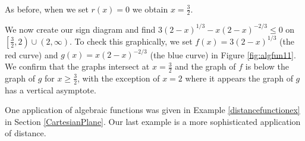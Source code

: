 {\begin{enumerate}
\begin{itemize}
\[\begin{array}{rclr}
       
\end{array}\]


As before, when we set $r(x) = 0$ we obtain $x = \frac{3}{2}$.


\end{itemize}

We now create our sign diagram and find  $3 (2-x)^{1/3} - x (2-x)^{-2/3} \leq 0$ on $\left[\frac{3}{2},2\right) \cup (2, \infty)$.  To check this graphically, we set $f(x)=3 (2-x)^{1/3}$ (the red curve) and $g(x) = x (2-x)^{-2/3}$ (the blue curve) in Figure \ref{fig:algfun11}. We confirm that the graphs intersect at $x=\frac{3}{2}$ and the graph of $f$ is below the graph of $g$ for $x \geq \frac{3}{2}$, with the exception of $x=2$ where it appears the graph of $g$ has a vertical asymptote. 


\end{enumerate}
}

\medskip

One application of algebraic functions was given in Example \ref{distancefunctionex} in Section \ref{CartesianPlane}.  Our last example is a more sophisticated application of distance.

\medskip

